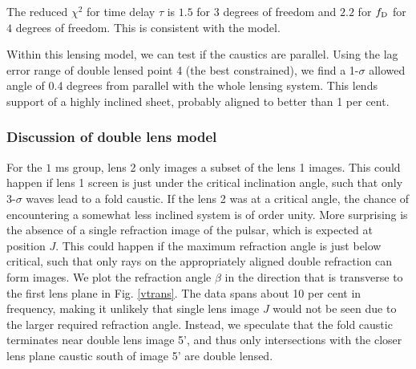 \documentclass[useAMS,usenatbib]{mn2e}
\begin{document}
The reduced ${\chi}^2$ for time delay $\tau$ is $1.5$
for $3$ degrees of freedom
and $2.2$ for $f_{\rm D}$ for $4$ degrees of freedom.  This is consistent with the model.


Within this lensing model, we can test if the 
caustics are parallel.  Using the lag error range of double lensed point 4 (the best
constrained), we find a 1-$\sigma$ allowed angle of 0.4 degrees from
parallel with the whole lensing system.  This lends support of a
highly inclined sheet, probably aligned to better than 1 per cent.




\subsubsection{Discussion of double lens model}
\label{subsec:doublelens}
For the $1$ ms group, lens 2
only images a subset of the lens 1 images.  This could happen if
lens 1 screen is just under the critical inclination
angle, such that only 3-$\sigma$ waves lead to a fold caustic.  If the lens 2 was at a critical angle, the chance of encountering a
somewhat less inclined system is of order unity.
More surprising is the absence of a single refraction
image of the pulsar, which is expected at position $J$.  This could
happen if the maximum refraction angle is just below critical, such
that only rays on the appropriately aligned double refraction can form
images.  
We plot the refraction angle $\beta$ in the
direction that is transverse to the first lens plane in Fig.
\ref{vtrans}. The data
spans about 10 per cent in frequency, making it unlikely that single lens
image $J$ would not be seen due to the larger required refraction
angle.  Instead, we speculate that the fold caustic terminates
near double lens image 5', and thus only intersections with the closer
lens plane caustic south of image 5' are double lensed.
\end{document}
